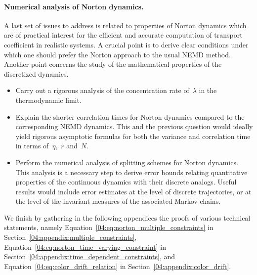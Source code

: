 \paragraph{Numerical analysis of Norton dynamics.}
A last set of issues to address is related to properties of Norton dynamics which are of practical interest for the efficient and accurate computation of transport coefficient in realistic systems. A crucial point is to derive clear conditions under which one should prefer the Norton approach to the usual NEMD method. Another point concerns the study of the mathematical properties of the discretized dynamics.
\begin{itemize}
    \item Carry out a rigorous analysis of the concentration rate of~$\lambda$ in the thermodynamic limit.
    \item Explain the shorter correlation times for Norton dynamics compared to the corresponding NEMD dynamics. This and the previous question would ideally yield rigorous asymptotic formulas for both the variance and correlation time in terms of~$\eta$,~$r$ and~$N$.
    \item Perform the numerical analysis of splitting schemes for Norton dynamics. This analysis is a necessary step to derive error bounds relating quantitative properties of the continuous dynamics with their discrete analogs. Useful results would include error estimates at the level of discrete trajectories, or at the level of the invariant measures of the associated Markov chains.
\end{itemize}

We finish by gathering in the following appendices the proofs of various technical statements, namely Equation~\eqref{04:eq:norton_multiple_constraints} in Section~\ref{04:appendix:multiple_constraints}, Equation~\eqref{04:eq:norton_time_varying_constraint} in Section~\ref{04:appendix:time_dependent_constraints}, and Equation~\eqref{04:eq:color_drift_relation} in Section~\ref{04:appendix:color_drift}. 

